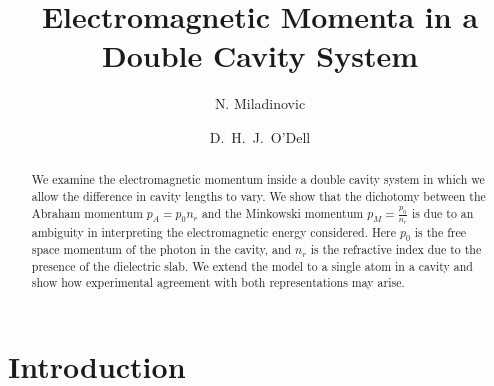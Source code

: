 \documentclass[twocolumn,english,pra,aps,superscriptaddress,floatfix]{revtex4-1}
\begin{document}
\author{N. Miladinovic}
\author{D.\ H.\ J.\ O'Dell}

\title{Electromagnetic Momenta in a Double Cavity System}

\begin{abstract}
\label{sec:abstract}
We examine the electromagnetic momentum inside a double cavity system in which we allow the difference in cavity lengths to vary.  We show that the dichotomy between the Abraham momentum $p_A= p_{0} n_{r}$ and the Minkowski momentum $p_M=\frac{p_{0}}{n_{r}}$ is due to an ambiguity in interpreting the electromagnetic energy considered.  Here $p_0$ is the free space momentum of the photon in the cavity, and $n_{r}$ is the refractive index due to the presence of the dielectric slab.  We extend the model to a single atom in a cavity and show how experimental agreement with both representations may arise. 
\end{abstract}


\maketitle

\section{Introduction}
\label{sec:intro}
\end{document}
